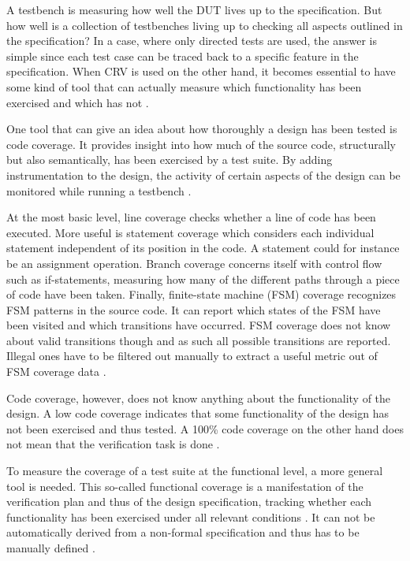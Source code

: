 A testbench is measuring how well the DUT lives up to the specification. But how well is a collection of
testbenches living up to checking all aspects outlined in the specification? In a case, where only directed tests are
used, the answer is simple since each test case can be traced back to a specific feature in the specification. When
CRV is used on the other hand, it becomes essential to have some kind of tool that can actually measure which
functionality has been exercised and which has not \cite[Ch. 15]{mehta2021introduction}.

One tool that can give an idea about how thoroughly a design has been tested is code coverage. It provides insight
into how much of the source code, structurally but also semantically, has been exercised by a test suite. By adding
instrumentation to the design, the activity of certain aspects of the design can be monitored while running a
testbench \cite[Ch. 2]{bergeron2012writing}.

At the most basic level, line coverage checks whether a line of code has been executed. More useful is statement
coverage which considers each individual statement independent of its position in the code. A statement could for
instance be an assignment operation. Branch coverage concerns itself with control flow such as if-statements,
measuring how many of the different paths through a piece of code have been taken. Finally, finite-state machine
(FSM) coverage recognizes FSM patterns in the source code. It can report which states of the FSM have been visited
and which transitions have occurred. FSM coverage does not know about valid transitions though and as such all
possible transitions are reported. Illegal ones have to be filtered out manually to extract a useful metric out of
FSM coverage data \cite[Ch. 15]{mehta2021introduction}.

Code coverage, however, does not know anything about the functionality of the design. A low code coverage indicates that
some functionality of the design has not been exercised and thus tested. A 100\% code coverage on the other hand does
not mean that the verification task is done \cite[Ch. 2]{bergeron2012writing}.

To measure the coverage of a test suite at the functional level, a more general tool is needed. This so-called
functional coverage is a manifestation of the verification plan and thus of the design specification, tracking whether
each functionality has been exercised under all relevant conditions \cite[Sec. 7.6]{flake2020a}. It can not be
automatically derived from a non-formal specification and thus has to be manually defined \cite[Ch. 15]{mehta2021introduction}.

